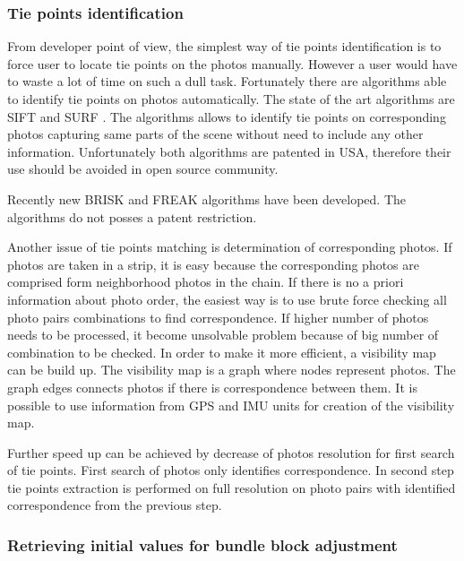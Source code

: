 \documentclass[a4paper,12pt]{article}
\begin{document}
\subsubsection{Tie points identification}

From developer point of view, the simplest way of tie points identification is to force user to locate tie points on 
the photos manually. However a  user would have to waste a lot of time on such a 
dull task. Fortunately there are algorithms able to identify tie points on photos
automatically. The state of the art algorithms are SIFT \cite{wiki:SIFT} and SURF \cite{wiki:SURF}.
The algorithms allows to identify tie points on corresponding photos capturing same parts of the scene without need to include any other information.
Unfortunately both algorithms are patented in USA, therefore their use should be avoided in open source community.

Recently new BRISK \cite{leutenegger2011brisk} and FREAK \cite{alahi2012freak} algorithms
have been developed. The algorithms do not posses a patent restriction. 

Another issue of tie points matching is determination of corresponding photos. 
If photos are taken in a strip, it is easy because the corresponding photos are comprised form neighborhood photos 
in the chain.
If there is no a priori information about photo order, the easiest way is to use brute force 
checking all photo pairs combinations to find correspondence.
If higher number of photos needs to be processed, it become unsolvable problem 
because of big number of combination to be checked. In order to make 
it more efficient, a visibility map \cite{barazzetti2010extraction} can be build up. 
The visibility map is a graph where nodes represent photos. The graph edges connects photos if there is
correspondence between them.  It is possible to use information from GPS and IMU units for creation of the visibility map.

Further speed up can be achieved by decrease of photos resolution 
for first search of tie points. First search of photos only identifies correspondence.
In second step tie points extraction is performed on full resolution 
on photo pairs with identified correspondence from the previous step.

\subsubsection{Retrieving initial values for bundle block adjustment}
\end{document}
